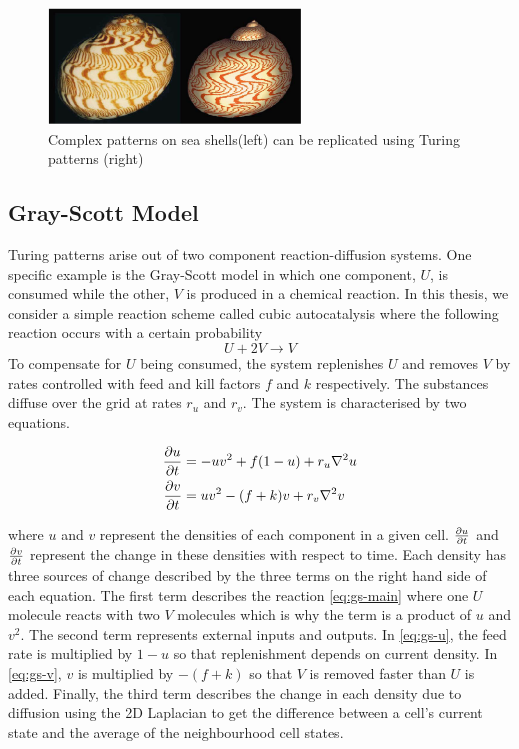 \begin{figure}[H]
\centering
\includegraphics[width=0.6\textwidth]{images/turing-shell.png}
\caption{Complex patterns on sea shells(left) can be replicated using Turing patterns (right) \cite{meinhardt2009algorithmic}}
\label{fig:seashells}
\end{figure}

\subsection{Gray-Scott Model}

Turing patterns arise out of two component reaction-diffusion systems. One specific example is the Gray-Scott model\cite{gray1983autocatalytic} in which one component, $U$, is consumed while the other, $V$ is produced in a chemical reaction. In this thesis, we consider a simple reaction scheme called cubic autocatalysis where the following reaction occurs with a certain probability
\begin{equation}\label{eq:gs-main}
  U + 2V \rightarrow V
\end{equation}
To compensate for $U$ being consumed, the system replenishes $U$ and removes $V$ by rates controlled with feed and kill factors $f$ and $k$ respectively. The substances diffuse over the grid at rates $r_u$ and $r_v$. The system is characterised by two equations.
\begin{definition} \label{def:reaction-diffusion}
\begin{align} 
  \label{eq:gs-u} \pdv{u}{t} &= -uv^2 + f(1-u) + r_u \nabla^2 u\\
  \label{eq:gs-v} \pdv{v}{t} &= uv^2 - (f+k)v + r_v \nabla^2 v
\end{align}
\end{definition}
where $u$ and $v$ represent the densities of each component in a given cell. $\pdv{u}{t}$ and $\pdv{v}{t}$ represent the change in these densities with respect to time. Each density has three sources of change described by the three terms on the right hand side of each equation. The first term describes the reaction \ref{eq:gs-main} where one $U$ molecule reacts with two $V$ molecules which is why the term is a product of $u$ and $v^2$. The second term represents external inputs and outputs. In \ref{eq:gs-u}, the feed rate is multiplied by $1-u$ so that replenishment depends on current density. In \ref{eq:gs-v}, $v$ is multiplied by $-(f+k)$ so that $V$ is removed faster than $U$ is added. Finally, the third term describes the change in each density due to diffusion using the 2D Laplacian to get the difference between a cell's current state and the average of the neighbourhood cell states.\\

